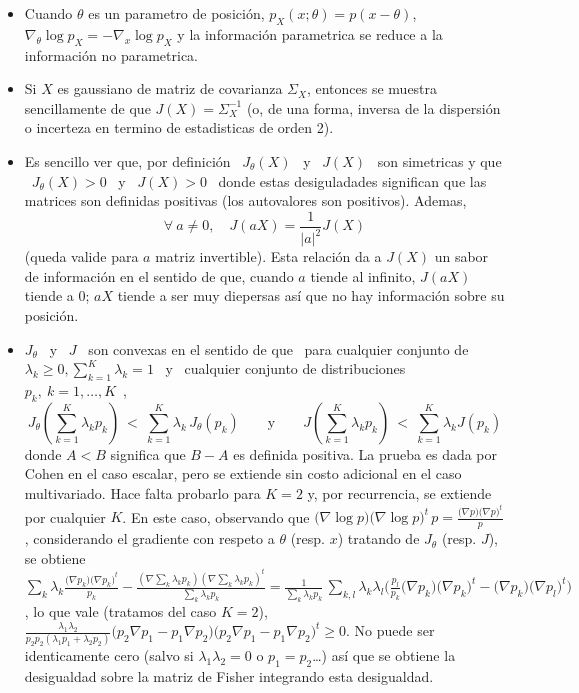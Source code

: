 \begin{itemize}
\item Cuando $\theta$ es un  parametro de posici\'on, $p_X(x;\theta) = p(x -
\theta)$,  $\nabla_\theta \log p_X  = -  \nabla_x \log  p_X$ y  la informaci\'on
parametrica se reduce a la informaci\'on no parametrica.
%
\item  Si $X$  es  gaussiano de  matriz  de covarianza  $\Sigma_X$, entonces  se
  muestra sencillamente de que $J(X)  = \Sigma_X^{-1}$ (o, de una forma, inversa
  de la dispersi\'on o incerteza en termino de estadisticas de orden 2).
%
\item Es sencillo ver  que, por definici\'on \ $J_\theta(X)$ \ y  \ $J(X)$ \ son
  simetricas  y  que \  $J_\theta(X)  > 0$  \  y  \ $J(X)  >  0$  \ donde  estas
  desiguladades  significan  que  las  matrices  son  definidas  positivas  (los
  autovalores son positivos).  Ademas,
  \[
  \forall \ a \ne 0, \quad J(aX) = \frac{1}{|a|^2} J(X)
  \]
  (queda valide  para $a$  matriz invertible).  Esta  relaci\'on da a  $J(X)$ un
  sabor de  informaci\'on en el sentido  de que, cuando $a$  tiende al infinito,
  $J(aX)$  tiende a  0;  $a X$  tiende  a ser  muy diepersas  as\'i  que no  hay
  informaci\'on sobre su posici\'on.
%
\item $J_\theta$ \ y \ $J$ \ son  convexas en el sentido de que \ para cualquier
  conjunto de  $\lambda_k \ge  0, \sum_{k=1}^K  \lambda_k = 1$  \ y  \ cualquier
  conjunto    de   distribuciones    \   $p_k,    \    k   =    1,   \ldots    ,
  K$~\cite{Coh68, Fri04},
  \[
  J_\theta\left(  \sum_{k=1}^K  \lambda_k  p_k  \right)  \:  <  \:  \sum_{k=1}^K
  \lambda_k  \,  J_\theta\left(  p_k  \right)  \qquad  \mbox{y}  \qquad  J\left(
    \sum_{k=1}^K \lambda_k  p_k \right) \:  < \: \sum_{k=1}^K  \lambda_k J\left(
    p_k \right)
  \]
%
  donde $A < B$ significa que $B-A$ es definida positiva.  La prueba es dada por
  Cohen en  el caso  escalar, pero se  extiende sin  costo adicional en  el caso
  multivariado. Hace falta  probarlo para $K=2$ y, por  recurrencia, se extiende
  por cualquier  $K$. En este  caso, observando que  $\big( \nabla \log  p \big)
  \big( \nabla \log p  \big)^t \, p = \frac{\big( \nabla p  \big) \big( \nabla p
    \big)^t}{p}$, considerando  el gradiente con respeto a  $\theta$ (resp. $x$)
  tratando de  $J_\theta$ (resp. $J$), se obtiene  $\sum_k \lambda_k \frac{\big(
    \nabla p_k \big) \big( \nabla p_k \big)^t}{p_k} - \frac{\left( \nabla \sum_k
      \lambda_k p_k \right) \left( \nabla \sum_k \lambda_k p_k \right)^t}{\sum_k
    \lambda_k  p_k} =  \frac{1}{\sum_k  \lambda_k p_k}  \, \sum_{k,l}  \lambda_k
  \lambda_l  \Big(  \frac{p_l}{p_k} \big(  \nabla  p_k  \big)  \big( \nabla  p_k
  \big)^t - \big( \nabla p_k \big)  \big( \nabla p_l \big)^t \Big)$, lo que vale
  (tratamos del caso  $K = 2$), $ \frac{\lambda_1  \lambda_2}{p_2 p_2 (\lambda_1
    p_1 + \lambda_2 p_2)} \big( p_2 \nabla  p_1 - p_1 \nabla p_2 \big) \big( p_2
  \nabla p_1  - p_1 \nabla p_2 \big)^t  \ge 0$. No puede  ser identicamente cero
  (salvo si $\lambda_1 \lambda_2 = 0$  o $p_1 = p_2$\ldots) as\'i que se obtiene
  la desigualdad sobre la matriz de Fisher integrando esta desigualdad.
\end{itemize}


